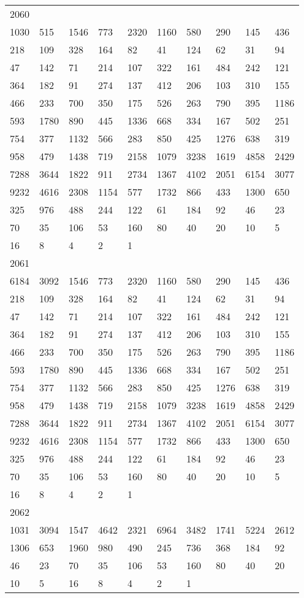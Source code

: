 \begin{longtable}{*{10}{l}}
2060&&&&&&&&&\\
1030& 515& 1546& 773& 2320& 1160& 580& 290& 145& 436\\
218& 109& 328& 164& 82& 41& 124& 62& 31& 94\\
47& 142& 71& 214& 107& 322& 161& 484& 242& 121\\
364& 182& 91& 274& 137& 412& 206& 103& 310& 155\\
466& 233& 700& 350& 175& 526& 263& 790& 395& 1186\\
593& 1780& 890& 445& 1336& 668& 334& 167& 502& 251\\
754& 377& 1132& 566& 283& 850& 425& 1276& 638& 319\\
958& 479& 1438& 719& 2158& 1079& 3238& 1619& 4858& 2429\\
7288& 3644& 1822& 911& 2734& 1367& 4102& 2051& 6154& 3077\\
9232& 4616& 2308& 1154& 577& 1732& 866& 433& 1300& 650\\
325& 976& 488& 244& 122& 61& 184& 92& 46& 23\\
70& 35& 106& 53& 160& 80& 40& 20& 10& 5\\
16& 8& 4& 2& 1& \\

2061&&&&&&&&&\\
6184& 3092& 1546& 773& 2320& 1160& 580& 290& 145& 436\\
218& 109& 328& 164& 82& 41& 124& 62& 31& 94\\
47& 142& 71& 214& 107& 322& 161& 484& 242& 121\\
364& 182& 91& 274& 137& 412& 206& 103& 310& 155\\
466& 233& 700& 350& 175& 526& 263& 790& 395& 1186\\
593& 1780& 890& 445& 1336& 668& 334& 167& 502& 251\\
754& 377& 1132& 566& 283& 850& 425& 1276& 638& 319\\
958& 479& 1438& 719& 2158& 1079& 3238& 1619& 4858& 2429\\
7288& 3644& 1822& 911& 2734& 1367& 4102& 2051& 6154& 3077\\
9232& 4616& 2308& 1154& 577& 1732& 866& 433& 1300& 650\\
325& 976& 488& 244& 122& 61& 184& 92& 46& 23\\
70& 35& 106& 53& 160& 80& 40& 20& 10& 5\\
16& 8& 4& 2& 1& \\

2062&&&&&&&&&\\
1031& 3094& 1547& 4642& 2321& 6964& 3482& 1741& 5224& 2612\\
1306& 653& 1960& 980& 490& 245& 736& 368& 184& 92\\
46& 23& 70& 35& 106& 53& 160& 80& 40& 20\\
10& 5& 16& 8& 4& 2& 1& \\


\end{longtable}
